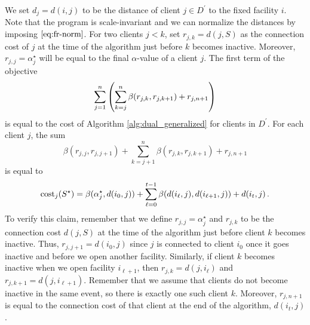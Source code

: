We set $d_j = d(i,j)$ to be the distance of client $j \in D^\prime$ to the fixed facility $i$. Note that the program is scale-invariant and we can normalize the distances by imposing $\eqref{eq:fr-norm}$. 
For two clients $j < k$, set $r_{j,k} = d(j,S)$ as the connection cost of $j$ at the time of the algorithm just before $k$ becomes inactive. Moreover, $r_{j,j} = \alpha^\star_j$ will be equal to the final $\alpha$-value of a client $j$. 
The first term of the objective 
\begin{equation*}
    \sum_{j=1}^n \left(\sum_{k=j}^{n} \beta(r_{j,k}, r_{j,k+1}) + r_{j,n+1}\right)
\end{equation*}
is equal to the cost of Algorithm \ref{alg:dual_generalized} for clients in $D^\prime$.
For each client $j$, the sum 
\[
     \beta(r_{j,j}, r_{j,j+1}) + \sum_{k=j+1}^{n} \beta(r_{j,k}, r_{j,k+1})+ r_{j,n+1}
\]
is equal to 
\[
    \textnormal{cost}_j(S^\star)
    =
    \beta(\alpha_j^\star,d(i_0,j))
    +
    \sum_{\ell=0}^{t-1}\beta(d(i_\ell,j),d(i_{\ell+1},j))
    +
    d(i_t,j)\,.
\]
To verify this claim, remember that we define $r_{j,j} = \alpha^\star_j$ and $r_{j,k}$ to be the connection cost $d(j,S)$ at the time of the algorithm just before client $k$ becomes inactive. Thus, $r_{j,j+1} = d(i_0,j)$ since $j$ is connected to client $i_0$ once it goes inactive and before we open another facility. Similarly, if client $k$ becomes inactive when we open facility $i_{\ell+1}$, then $r_{j,k} = d(j, i_{\ell})$ and $r_{j,k+1} = d(j, i_{\ell+1})$. Remember that we assume that clients do not become inactive in the same event, so there is exactly one such client $k$. 
Moreover, $r_{j,n+1}$ is equal to the connection cost of that client at the end of the algorithm, $d(i_t,j)$.

